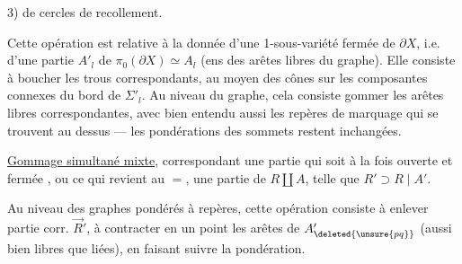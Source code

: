 
3)   de cercles de recollement.

Cette opération est relative à la donnée d'une 1-sous-variété fermée de $\partial X$, i.e. d'une partie $A'_l$ de $\pi_0(\partial X)\simeq A_l$ (ens des arêtes libres du graphe).
Elle consiste à boucher les trous correspondants, au moyen des cônes sur les composantes connexes du bord de $\Sigma'_l$.
Au niveau du graphe, cela consiste  gommer les arêtes libres correspondantes, avec bien entendu aussi les repères de marquage qui se trouvent au dessus ---  les pondérations des sommets restent inchangées.

\uline{Gommage simultané mixte},  correspondant  une partie
    
qui soit à la fois ouverte et fermée  
\unsure{,}
,
\unsure{,}
ou ce qui revient au $=$, une partie  de $R\amalg A$, telle que $R'\supset R\mid A'$.

Au niveau des graphes pondérés à repères, cette opération consiste à enlever   partie corr. $\vec R'$, à contracter en un point les arêtes de $A'_{\deleted{\unsure{pq}}}$ (aussi bien libres que liées), en faisant suivre la pondération.

